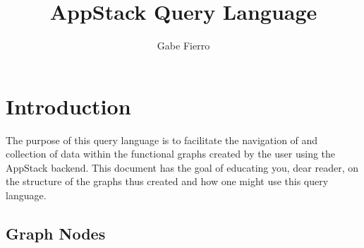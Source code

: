 \documentclass{article}
\title{AppStack Query Language}
\author{Gabe Fierro}
\date{}
\begin{document}
\maketitle
\section{Introduction} %
\label{sec:introduction}
The purpose of this query language is to facilitate the navigation of and collection of data within the functional graphs created by the user using the AppStack backend. This document has the goal of educating you, dear reader, on the structure of the graphs thus created and how one might use this query language.

\subsection{Graph Nodes} %
\label{sub:graph_nodes}
\end{document}
